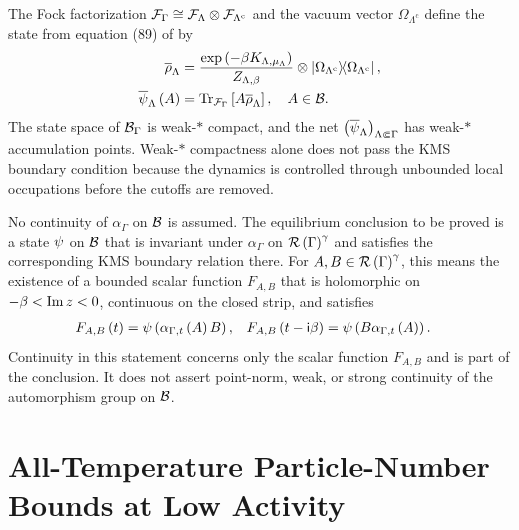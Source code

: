 \documentclass[11pt,a4paper]{article}
\theoremstyle{plain}
\theoremstyle{definition}
\theoremstyle{remark}
\begin{document}
The Fock factorization \(\sphilb{F}_{\Gamma} \cong \sphilb{F}_{\Lambda} \otimes \sphilb{F}_{\Lambda^{\mathrm{c}}}\) and the vacuum vector \(\Omega_{\Lambda^{\mathrm{c}}}\) define the state from equation (89) of \cite{DeuchertLampartLemm001} by \begin{equation}
\begin{aligned}
\overline{\rho}_{\Lambda}
& =
\frac{\fnexp{-\beta K_{\Lambda,\smchemicalpotential_{\Lambda}}}}
{Z_{\Lambda,\beta}}
\otimes
\ketbra{\Omega_{\Lambda^{\mathrm{c}}}}{\Omega_{\Lambda^{\mathrm{c}}}},
\\
\fun{\oastate[\overline{\psi}_{\Lambda}]}{A}
& =
\sqfun{\trace_{\sphilb{F}_{\Gamma}}}{A\overline{\rho}_{\Lambda}},
\quad
A \in \oa{B}.
\end{aligned}
\label{eq:fock-vacuum-extended-gibbs-state}
\end{equation} The state space of \(\mathcal{B}_{\Gamma}\) is weak-\(\ast\) compact, and the net \(\seq{\oastate[\overline{\psi}_{\Lambda}]}{\Lambda \Subset \Gamma}\) has weak-\(\ast\) accumulation points. Weak-\(\ast\) compactness alone does not pass the KMS boundary condition because the dynamics is controlled through unbounded local occupations before the cutoffs are removed.

No continuity of \(\alpha_{\Gamma}\) on \(\mathcal{B}\) is assumed. The equilibrium conclusion to be proved is a state \(\oastate[\psi]\) on \(\mathcal{B}\) that is invariant under \(\alpha_{\Gamma}\) on \(\mathcal{R} \left( \Gamma \right)^{\gamma}\) and satisfies the corresponding KMS boundary relation there. For \(A,B \in \mathcal{R} \left( \Gamma \right)^{\gamma}\), this means the existence of a bounded scalar function \(F_{A,B}\) that is holomorphic on \(-\beta < \operatorname{Im} z < 0\), continuous on the closed strip, and satisfies \begin{equation}
\begin{aligned}
\fun{F_{A,B}}{t}
& =
\fun{\oastate[\psi]}{\fun{\alpha_{\Gamma,t}}{A}B},
&
\fun{F_{A,B}}{t-\imunit\beta}
& =
\fun{\oastate[\psi]}{B\fun{\alpha_{\Gamma,t}}{A}}.
\end{aligned}
\label{eq:fock-infinite-volume-kms-boundary}
\end{equation} Continuity in this statement concerns only the scalar function \(F_{A,B}\) and is part of the conclusion. It does not assert point-norm, weak, or strong continuity of the automorphism group on \(\mathcal{B}\).

\section{All-Temperature Particle-Number Bounds at Low Activity}\label{all-temperature-particle-number-bounds-at-low-activity}
\end{document}
